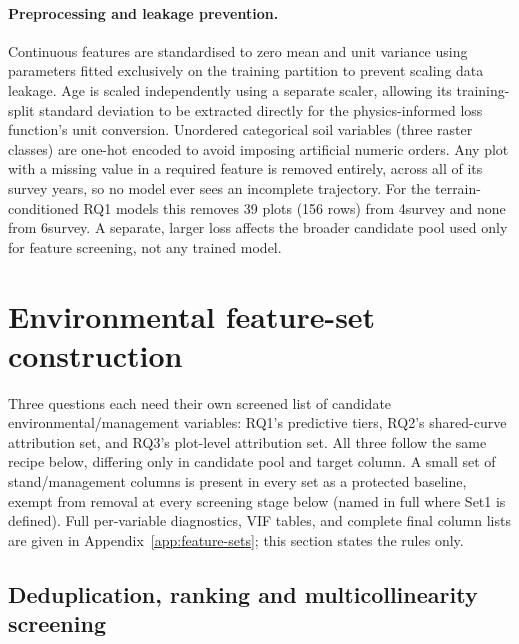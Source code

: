 \documentclass[11pt,a4paper]{report}
\begin{document}
\paragraph*{Preprocessing and leakage prevention.}
Continuous features are standardised to zero
mean and unit variance using parameters fitted exclusively on the training partition to prevent
scaling data leakage. Age is scaled independently using a separate scaler, allowing its
training-split standard deviation to be extracted directly for the physics-informed loss
function's unit conversion. Unordered categorical soil variables
(three raster classes) are one-hot encoded to avoid imposing artificial numeric orders. Any plot
with a missing value in a required feature is removed entirely, across all of its survey years,
so no model ever sees an incomplete trajectory. For the terrain-conditioned RQ1 models this
removes 39 plots (156 rows) from 4survey and none from 6survey. A separate, larger loss affects
the broader candidate pool used only for feature screening, not any trained model.

\section{Environmental feature-set construction}

Three questions each need their own screened list of candidate environmental/management
variables: RQ1's predictive tiers, RQ2's shared-curve attribution set, and RQ3's plot-level
attribution set. All three follow the same recipe below, differing only in candidate pool and
target column. A small set of stand/management columns is present in every set as a protected
baseline, exempt from removal at every screening stage below (named in full where Set1 is
defined). Full per-variable diagnostics, VIF tables, and complete final column
lists are given in Appendix~\ref{app:feature-sets}; this section states the rules only.

\subsection{Deduplication, ranking and multicollinearity screening}
\end{document}
